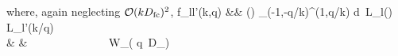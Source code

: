                                                                                                                                                                                                                                                                            \label{DeltaPell}
                                                                                                                                                                                                                                                                           \eeq
                                                                                                                                                                                                                                                                           where, again neglecting ${\cal O}(k D_\mathrm{fc})^2$,
                                                                                                                                                                                                                                                                           \beqa
                                                                                                                                                                                                                                                                           f_{ll'}(k,q) &\equiv &
                                                                                                                                                                                                                                                                           \Big(\Big) \int_{(-1,-q/k)}^{(1,q/k)} d\mu  \, {\cal L}_l(\mu)\, {\cal L}_{l'}(k\mu/q) \nonumber \\ & &
                                                                                                                                                                                                                                                                            \  \ \ \ \ \ \ \ \ \ \ \ \ \times \ W_( q\, D_)
                                                                                                                                                                                                                                                                            \label{fellellp}
                                                                                                                                                                                                                                                                            \eeqa
